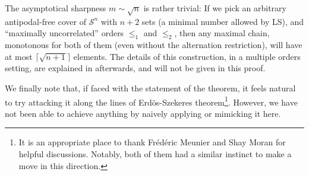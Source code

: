 \documentclass{article} %
\renewcommand{\S}{\mathcal{S}}
\begin{document}
The asymptotical sharpness $m\sim \sqrt{n}$ is rather trivial: If we pick an arbitrary antipodal-free cover of $\S^n$ with $n+2$ sets (a minimal number allowed by LS), and ``maximally uncorrelated'' orders $\leq_1$ and $\leq_2$, then any maximal chain, monotonous for both of them (even without the alternation restriction), will have at most $\lceil\sqrt{n+1}\rceil$ elements. The details of this construction, in a multiple orders setting, are explained in  afterwards, and will not be given in this proof.

We finally note that, if faced with the statement of the theorem, it feels natural to try attacking it along the lines of Erd\"os-Szekeres theorem\footnote{It is an appropriate place to thank Fr\'ed\'eric Meunier and Shay Moran for helpful discussions. Notably, both of them had a similar instinct to make a move in this direction.}. However, we have not been able to achieve anything by naively applying or mimicking it here.
\end{document}
